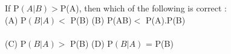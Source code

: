 \documentclass[journal,12pt,twocolumn]{IEEEtran}
\theoremstyle{remark}
\begin{document}
  
  
  

If P$(A|B)>$P(A), then which of the following is correct :\\
(A) P$(B|A)<$ P(B) (B) P(AB)$ <$ P(A).P(B)\\
\\
(C) P$(B|A)>$ P(B) (D) P$(B|A)$ = P(B)\\
\end{document}
